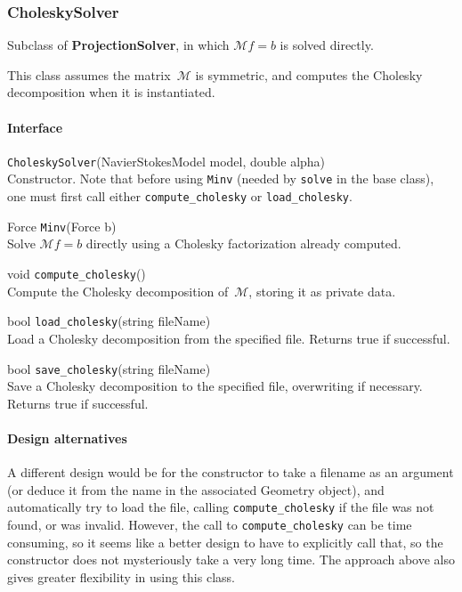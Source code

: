 \documentclass[11pt]{article}
\def\class#1{{\bf #1}} %
\def\fn#1{{\tt #1}} %
\begin{document}
\subsubsection{CholeskySolver}
Subclass of \class{ProjectionSolver}, in which $\mathcal{M}f=b$ is solved directly.

This class assumes the matrix~$\mathcal{M}$ is symmetric, and computes the Cholesky decomposition when it is instantiated.

\paragraph{Interface}
\begin{description}
	\item \fn{CholeskySolver}(NavierStokesModel model, double alpha)\\
		Constructor.  Note that before using \fn{Minv} (needed by \fn{solve} in the base class), one must first call either \fn{compute\_cholesky} or \fn{load\_cholesky}.
	\item Force \fn{Minv}(Force b)\\
		Solve $\mathcal{M}f = b$ directly using a Cholesky factorization already computed.
	\item void \fn{compute\_cholesky}()\\
		Compute the Cholesky decomposition of~$\mathcal{M}$, storing it as private data.
	\item bool \fn{load\_cholesky}(string fileName)\\
		Load a Cholesky decomposition from the specified file.  Returns true if successful.
	\item bool \fn{save\_cholesky}(string fileName)\\
		Save a Cholesky decomposition to the specified file, overwriting if necessary.  Returns true if successful.
\end{description}

\paragraph{Design alternatives}
A different design would be for the constructor to take a filename as an argument (or deduce it from the name in the associated Geometry object), and automatically try to load the file, calling \fn{compute\_cholesky} if the file was not found, or was invalid.  However, the call to \fn{compute\_cholesky} can be time consuming, so it seems like a better design to have to explicitly call that, so the constructor does not mysteriously take a very long time.  The approach above also gives greater flexibility in using this class.
\end{document}
